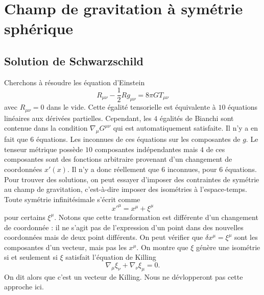 \documentclass[a4paper,11pt]{report}
\begin{document}
\chapter{Champ de gravitation à symétrie sphérique}

    \section{Solution de Schwarzschild}
    
        Cherchons à résoudre les équation d'Einstein
        \begin{equation}
            R_{\mu\nu}-\frac{1}{2}Rg_{\mu\nu} = 8\pi G T_{\mu\nu}
        \end{equation}
        avec $R_{\mu\nu} = 0$ dans le vide. Cette égalité tensorielle est équivalente à $10$ équations linéaires aux dérivées partielles. Cependant, les $4$ égalités de Bianchi sont contenue dans la condition $\nabla_\mu G^{\mu\nu}$ qui est automatiquement satisfaite. Il n'y a en fait que $6$ équations. Les inconnues de ces équations sur les composantes de $g$. Le tenseur métrique possède $10$ composantes indépendantes mais $4$ de ces composantes sont des fonctions arbitraire provenant d'un changement de coordonnées $x'(x)$. Il n'y a donc réellement que $6$ inconnues, pour $6$ équations.\\
        
        Pour trouver des solutions, on peut essayer d'imposer des contraintes de symétrie au champ de gravitation, c'est-à-dire imposer des isométries à l'espace-temps. Toute symétrie infinitésimale s'écrit comme
        \begin{equation}
            x'^\mu = x^\mu +  \xi^\mu
        \end{equation}
        pour certains $ \xi^\mu$. Notons que cette transformation est différente d'un changement de coordonnée : il ne s'agit pas de l'expression d'un point dans des nouvelles coordonnées mais de deux point différents. On peut vérifier que $\delta x^\mu = \xi^\mu$ sont les composantes d'un vecteur, mais pas les $x^\mu$. On montre que $\xi$ génère une isométrie si et seulement si $\xi$ satisfait l'équation de Killing
        \begin{equation}
            \nabla_\mu\xi_\nu+\nabla_\nu\xi_\mu = 0.
        \end{equation}
        On dit alors que c'est un vecteur de Killing. Nous ne dévlopperont pas cette approche ici.\\
        
\end{document}
